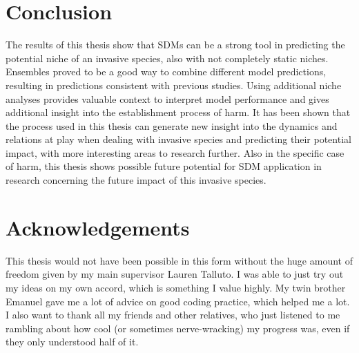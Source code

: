 \documentclass[12pt,a4paper]{article}
\begin{document}
\section{Conclusion} \label{sec:conclusion}
The results of this thesis show that SDMs can be a strong tool in predicting the potential niche of an invasive species, also with not completely static niches.
Ensembles proved to be a good way to combine different model predictions, resulting in predictions consistent with previous studies.
Using additional niche analyses provides valuable context to interpret model performance and gives additional insight into the establishment process of \gls{harm}.
It has been shown that the process used in this thesis can generate new insight into the dynamics and relations at play when dealing with invasive species and predicting their potential impact, with more interesting areas to research further.
Also in the specific case of \gls{harm}, this thesis shows possible future potential for SDM application in research concerning the future impact of this invasive species.


\section{Acknowledgements} \label{sec:acknowledgements}
This thesis would not have been possible in this form without the huge amount of freedom given by my main supervisor Lauren Talluto.
I was able to just try out my ideas on my own accord, which is something I value highly.
My twin brother Emanuel gave me a lot of advice on good coding practice, which helped me a lot.
I also want to thank all my friends and other relatives, who just listened to me rambling about how cool (or sometimes nerve-wracking) my progress was, even if they only understood half of it.

\newpage
\printbibliography[]

\end{document}
